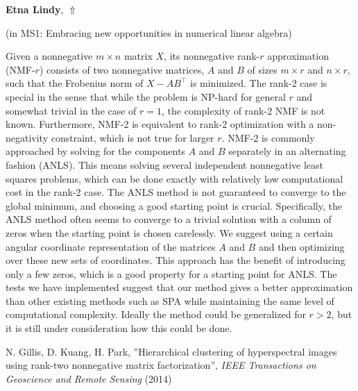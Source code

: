 \documentclass[ILAS2025-program.tex]{subfiles}
\begin{document}
\hypertarget{down0271}{}\begin{ilasabstract}
    
\textbf{Etna Lindy},  \hfill \hyperlink{up0271}{$\Uparrow$}
    
    
(in {\color{mstitle}MS1: Embracing new opportunities in numerical linear algebra})
        
\mtskip
    \begin{bibunit}
        Given a nonnegative $m \times n$ matrix $X$, its nonnegative rank-$r$ approximation (NMF-$r$) consists of two nonnegative matrices, $A $ and $B$ of sizes $m\times r$ and $n\times r$, such that the Frobenius norm of $X - AB^\top$ is minimized. The rank-2 case is special in the sense that while the problem is NP-hard for general $r$ and somewhat trivial in the case of $r=1$, the complexity of rank-2 NMF is not known. Furthermore, NMF-2 is equivalent to rank-2 optimization with a non-negativity constraint, which is not true for larger $r$.
NMF-2 is commonly approached by solving for the components $A$ and $B$ separately in an alternating fashion (ANLS). This means solving several independent nonnegative least squares problems, which can be done exactly with relatively low computational cost in the rank-2 case. The ANLS method is not guaranteed to converge to the global minimum, and choosing a good starting point is crucial. Specifically, the ANLS method often seems to converge to a trivial solution with a column of zeros when the starting point is chosen carelessly. 
We suggest using a certain angular coordinate representation of the matrices $A$ and $B$ and then optimizing over these new sets of coordinates.
This approach has the benefit of introducing only a few zeros, which is a good property for a starting point for ANLS.
The tests we have implemented suggest that our method gives a better approximation than other existing methods such as SPA \cite{gillis2014hierarchical} while maintaining the same level of computational complexity.
Ideally the method could be generalized for $r > 2$, but it is still under consideration how this could be done.

\begin{thebibliography}{9}
N. Gillis, D. Kuang, H. Park, ''Hierarchical clustering of hyperspectral images using rank-two nonnegative matrix factorization'', {\it IEEE Transactions on Geoscience and
Remote Sensing} (2014)
\end{thebibliography}
        \end{bibunit}
        
\end{ilasabstract}
    
\end{document}
